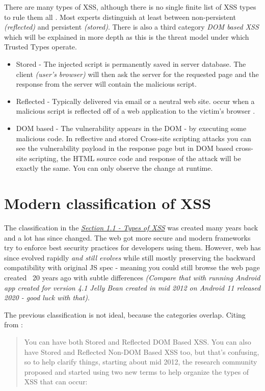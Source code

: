 There are many types of XSS, although there is no single finite list of XSS types to rule them all
\cite{lotr_fellowship}. Most experts distinguish at least between non-persistent \emph{(reflected)}
and persistent \emph{(stored)}. There is also a third category \emph{DOM based XSS} which will be
explained in more depth as this is the threat model under which Trusted Types operate.

\begin{itemize}
  \item  Stored - The injected script is permanently saved in server database. The client
        \emph{(user's browser)} will then ask the server for the requested page and the response
        from the server will contain the malicious script.
  \item  Reflected - Typically delivered via email or a neutral web site. occur when a malicious
        script is reflected off of a web application to the victim’s browser \cite{reflected_xss}.
  \item  DOM based - The vulnerability appears in the DOM - by executing some malicious code. In
        reflective and stored Cross-site scripting attacks you can see the vulnerability payload in
        the response page but in DOM based cross-site scripting, the HTML source code and response
        of the attack will be exactly the same. You can only observe the change at runtime.
\end{itemize}

\section{Modern classification of XSS}

The classification in the \emph{\hyperref[chapter:xss:types]{Section 1.1 - Types of XSS}} was
created many years back and a lot has since changed. The web got more secure and modern frameworks
try to enforce best security practices for developers using them. However, web has since evolved
rapidly \emph{and still evolves} while still mostly preserving the backward compatibility with
original JS spec - meaning you could still browse the web page created ~20 years ago with subtle
differences \emph{(Compare that with running Android app created for version 4.1 Jelly Bean created
  in mid 2012 on Android 11 released 2020 - good luck with that)}.

The previous classification is not ideal, because the categories overlap. Citing from
\cite{xss_owasp_types}:
\begin{quotation}
  You can have both Stored and Reflected DOM Based XSS. You can also have Stored and Reflected
  Non-DOM Based XSS too, but that’s confusing, so to help clarify things, starting about mid 2012,
  the research community proposed and started using two new terms to help organize the types of XSS
  that can occur:
\end{quotation}

